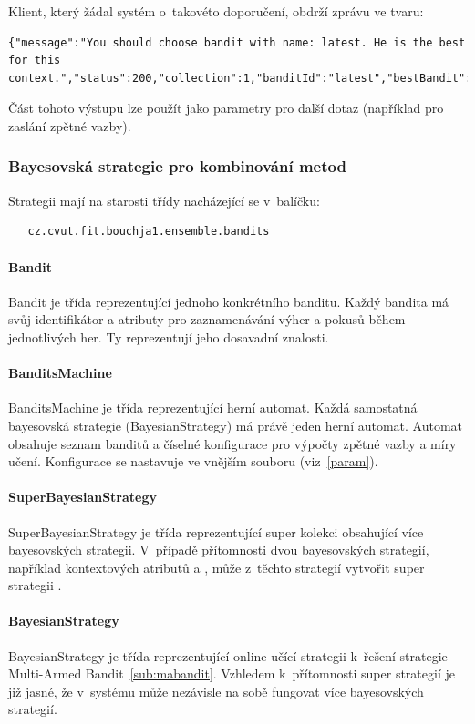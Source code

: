 \documentclass[thesis=M,czech]{FITthesis}[2014/05/07]
\begin{document}
Klient, který žádal systém o~takovéto doporučení, obdrží zprávu ve tvaru:

\begin{lstlisting}
{"message":"You should choose bandit with name: latest. He is the best for this context.","status":200,"collection":1,"banditId":"latest","bestBandit":2}
\end{lstlisting}

Část tohoto výstupu lze použít jako parametry pro další dotaz (například pro zaslání zpětné vazby).

\subsubsection{Bayesovská strategie pro kombinování metod}

Strategii mají na starosti třídy nacházející se v~balíčku:

\begin{verbatim}
   cz.cvut.fit.bouchja1.ensemble.bandits
\end{verbatim}

\paragraph{Bandit}
Bandit je třída reprezentující jednoho konkrétního banditu. Každý bandita má svůj identifikátor a atributy pro zaznamenávání výher a pokusů během jednotlivých her. Ty reprezentují jeho dosavadní znalosti.
\paragraph{BanditsMachine}
BanditsMachine je třída reprezentující herní automat. Každá samostatná bayesovská strategie (BayesianStrategy) má právě jeden herní automat. Automat obsahuje seznam banditů a číselné konfigurace pro výpočty zpětné vazby a míry učení. Konfigurace se nastavuje ve vnějším souboru (viz~\ref{param}).
\paragraph{SuperBayesianStrategy} SuperBayesianStrategy je třída reprezentující super kolekci obsahující více bayesovských strategii. V~případě přítomnosti dvou bayesovských strategií, například kontextových atributů  a , může z~těchto strategií vytvořit super strategii .
\paragraph{BayesianStrategy}	BayesianStrategy je třída reprezentující online učící strategii k~řešení strategie Multi-Armed Bandit~\ref{sub:mabandit}. Vzhledem k~přítomnosti super strategií je již jasné, že v~systému může nezávisle na sobě fungovat více bayesovských strategií. 
\end{document}
